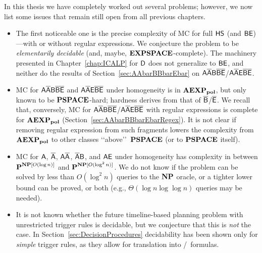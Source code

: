 In this thesis we have completely worked out several problems; however, we now list some issues that remain still open from all previous chapters. 
\begin{itemize}
    \item The first noticeable one is the precise complexity of MC for full $\text{\sffamily HS}$ (and $\mathsf{BE}$)---with or without regular expressions. We conjecture the problem to be \emph{elementarily decidable} (and, maybe, $\textbf{EXPSPACE}$-complete). The machinery presented in Chapter~\ref{chap:ICALP} for $\mathsf{D}$ does not generalize to $\mathsf{BE}$, and neither do the results of Section~\ref{sec:AAbarBBbarEbar} on $\mathsf{A\overline{A}B\overline{B}\overline{E}}$/$\mathsf{A\overline{A}E\overline{B}\overline{E}}$. 
    \item MC for $\mathsf{A\overline{A}B\overline{B}\overline{E}}$ and $\mathsf{A\overline{A}E\overline{B}\overline{E}}$ under homogeneity is in $\mathbf{AEXP_{pol}}$, but only known to be $\textbf{PSPACE}$-hard; hardness derives from that of $\mathsf{\overline{B}}$/$\mathsf{\overline{E}}$. We recall that, conversely, MC for $\mathsf{A\overline{A}B\overline{B}\overline{E}}$/$\mathsf{A\overline{A}E\overline{B}\overline{E}}$ with regular expressions is complete for $\mathbf{AEXP_{pol}}$ (Section~\ref{sec:AAbarBBbarEbarRegex}). It is not clear if removing regular expression from such fragments lowers the complexity from $\mathbf{AEXP_{pol}}$ to other classes \lq\lq above\rq\rq\ $\textbf{PSPACE}$ (or to $\textbf{PSPACE}$ itself).
    \item MC for $\mathsf{A}$, $\mathsf{\overline{A}}$, $\mathsf{A\overline{A}}$, $\mathsf{\overline{A}B}$, and $\mathsf{AE}$ under homogeneity has complexity in between $\textbf{P}^{\textbf{NP}[O(\log n)]}$ and $\textbf{P}^{\textbf{NP}[O(\log^2 n)]}$. We do not know if the problem can be solved by less than $O(\log^2 n)$ queries to the $\textbf{NP}$ oracle, or a tighter lower bound can be proved, or both (e.g., $\Theta(\log n \log\log n)$ queries may be needed).
    \item It is not known whether the future timeline-based planning problem 
    with unrestricted trigger rules is decidable, but we conjecture that this 
    is \emph{not} the case. In Section~\ref{sec:DecisionProcedures} 
    decidability has been shown only for \emph{simple} trigger rules, as they 
    allow for translation into \MTL/\MITL\ formulas.
\end{itemize}


